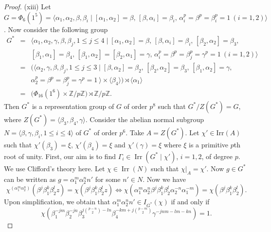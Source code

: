 \documentclass[a4paper,11pt]{amsart}
\numberwithin{equation}{section}
\numberwithin{equation}{subsection}
\newcommand{\Z}{\mathbb{Z}}
\newcommand{\poonam}[1]{{\color{blue} #1}}
\begin{document}
\begin{proof}
(xiii) Let $G = \Phi_{6}(1^5) = \langle \alpha_1, \alpha_2, \beta, \beta_i \mid 
[\alpha_1,\alpha_2] = \beta,\,
[\beta,\alpha_i] = \beta_i,\,
\alpha_i^p = \beta^p = \beta_i^p = 1 \ (i=1,2) \rangle$. Now consider the following group 
\begin{eqnarray*}
	G^*&=&\langle \alpha_1, \alpha_2, \gamma ,\beta, \beta_j, 1\leq j \leq 4  \mid 
	[\alpha_1,\alpha_2] = \beta,\, 
	[\beta,\alpha_i] = \beta_i,\, [\beta_2,\alpha_2] = \beta_3,\, \\
	&& [\beta_1,\alpha_1] = \beta_4,\,
	[\beta_1,\alpha_2] = [\beta_2,\alpha_1] = \gamma,\,
	\alpha_i^p = \beta^p = \beta_j^p = \gamma^p = 1 \ (i=1,2) \rangle \\
	&=& \big(\langle  \alpha_2, \gamma ,\beta, \beta_j, 1\leq j \leq 3  \mid 
	[\beta,\alpha_2] = \beta_2,\, [\beta_2,\alpha_2] = \beta_3,\, [\beta_1,\alpha_2] =  \gamma,\, \\
	&& \alpha_2^p = \beta^p = \beta_j^p = \gamma^p = 1 \ \rangle \times \langle \beta_4 \rangle\big) \rtimes \langle \alpha_1 \rangle \\
	&=&\big(\Phi_{16}(1^6) \times  \Z/p\Z \big) \rtimes  \Z/p\Z.
\end{eqnarray*}
Then $G^*$ is a representation group of $G$ of order $p^8$ such that $G^*/Z(G^*)= G$, where $Z(G^*)= \langle \beta_3, \beta_4, \gamma \rangle$. 
Consider the abelian normal subgroup $N =\langle \beta, \gamma, \beta_i, 1 \leq i \leq 4 \rangle$ of ${G}^*$ of order $p^6$. Take $A= Z(G^*)$. Let $\chi' \in \mathrm{Irr}(A)$ such that $\chi'(\beta_3) = \xi$, $\chi'(\beta_4) = \xi$ and $\chi'(\gamma) = \xi$ where $\xi$ is a primitive $p$th root of unity. First, our aim is to find $\Gamma_i \in\operatorname{Irr}(G^* \mid \chi')$, $i=1,2$, of degree $p$. %
We use Clifford's theory here. Let $\chi \in \operatorname{Irr}(N)$ such that
$\chi|_{A} = \chi'$. Now $g \in {G}^*$ can be written as $g = \alpha_1^m \alpha_2^n n'$
for some $n' \in N$.
Now we have
$$\chi^{(\alpha_1^m \alpha_2^n)}(\beta^j \beta_1^k \beta_2^l z) = \chi(\beta^j \beta_1^k \beta_2^l z)
\iff \chi(\alpha_1^m \alpha_2^n \beta^j \beta_1^k \beta_2^l \alpha_2^{-n} \alpha_1^{-m}) = \chi(\beta^j \beta_1^k \beta_2^l).$$
Upon simplification, we obtain that
$\alpha_1^m \alpha_2^nn' \in I_{{G}^*}(\chi)$
if and only if
\[
\chi(\beta_1^{-jm} \beta_2^{-jn} \beta_3^{j\binom{p-n}{2}-ln} \beta_4^{-km+j\binom{p-m}{2}} \gamma^{-jnm-lm-kn}) = 1.
\]
\end{proof}
\end{document}
